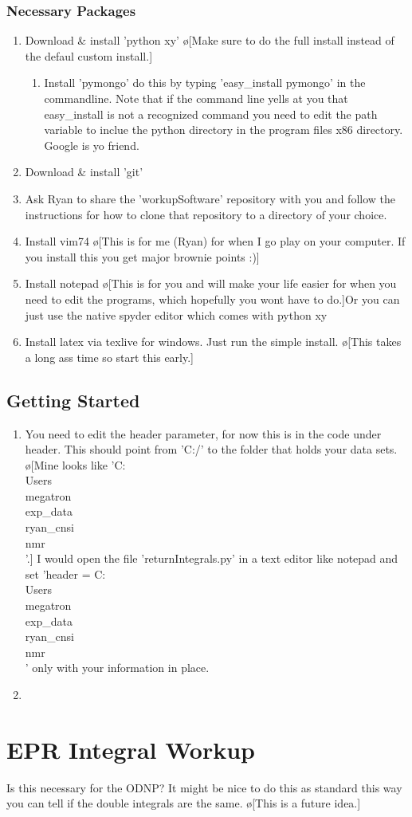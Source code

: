 \documentclass[10pt]{book}
\begin{document}
\subsection{Necessary Packages}
\begin{enumerate}
    \item Download \& install 'python xy' \o[Make sure to do the full install instead of the defaul custom install.]{}
        \begin{enumerate}
            \item Install 'pymongo' do this by typing 'easy_install pymongo' in the commandline. Note that if the command line yells at you that easy_install is not a recognized command you need to edit the path variable to inclue the python directory in the program files x86 directory. Google is yo friend.
        \end{enumerate}
    \item Download \& install 'git'
    \item Ask Ryan to share the 'workupSoftware' repository with you and follow the instructions for how to clone that repository to a directory of your choice.
    \item Install vim74 \o[This is for me (Ryan) for when I go play on your computer. If you install this you get major brownie points :)]{}
    \item Install notepad \o[This is for you and will make your life easier for when you need to edit the programs, which hopefully you wont have to do.]{Or you can just use the native spyder editor which comes with python xy}
    \item Install latex via texlive for windows. Just run the simple install. \o[This takes a long ass time so start this early.]{}
\end{enumerate}
\section{Getting Started}
\begin{enumerate}
    \item You need to edit the header parameter, for now this is in the code under header. This should point from 'C:/' to the folder that holds your data sets. \o[Mine looks like 'C:\\Users\\megatron\\exp_data\\ryan_cnsi\\nmr\\'.] I would open the file 'returnIntegrals.py' in a text editor like notepad and set 'header = C:\\Users\\megatron\\exp_data\\ryan_cnsi\\nmr\\' only with your information in place.
    \item 
\end{enumerate}
\chapter{EPR Integral Workup}
Is this necessary for the ODNP? It might be nice to do this as standard this way you can tell if the double integrals are the same. \o[This is a future idea.]
\end{document}
